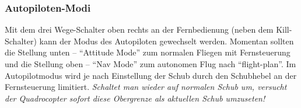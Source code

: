 \subsubsection{Autopiloten-Modi}
Mit dem drei Wege-Schalter oben rechts an der Fernbedienung (neben dem Kill-Schalter) kann der Modus des Autopiloten gewechselt werden.
Momentan sollten die Stellung unten – \enquote{Attitude Mode} zum normalen Fliegen mit Fernsteuerung und die Stellung oben – \enquote{Nav Mode} zum autonomen Flug nach \enquote{flight-plan}.
Im Autopilotmodus wird je nach Einstellung der Schub durch den Schubhebel an der Fernsteuerung limitiert. \emph{Schaltet man wieder auf normalen Schub um, versucht der Quadrocopter sofort diese Obergrenze als aktuellen Schub umzuseten!}

